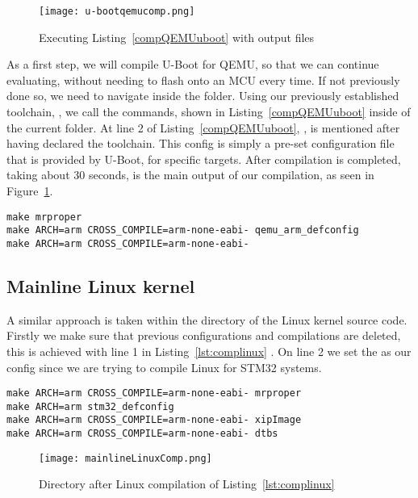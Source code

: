 \begin{figure}[H]
\centering
\texttt{[image: u-bootqemucomp.png]}
\caption{Executing Listing~\ref{compQEMUuboot} with output files}
\label{fig:u-bootqemucomp}
\end{figure}

As a first step, we will compile U-Boot for QEMU, so that we can continue evaluating, without needing to flash onto an MCU every time. If not previously done so, we need to navigate inside the folder. Using our previously established toolchain, , we call the commands, shown in Listing~\ref{compQEMUuboot} inside of the current folder. At line 2 of Listing~\ref{compQEMUuboot}, , is mentioned after having declared the toolchain. This config is simply a pre-set configuration file that is provided by U-Boot, for specific targets. After compilation is completed, taking about 30 seconds,  is the main output of our compilation, as seen in Figure~\ref{fig:u-bootqemucomp}.

\begin{lstlisting}[style=SH, caption=Compiling U-Boot for QEMU, label=compQEMUuboot]
make mrproper
make ARCH=arm CROSS_COMPILE=arm-none-eabi- qemu_arm_defconfig
make ARCH=arm CROSS_COMPILE=arm-none-eabi-
\end{lstlisting}



\subsection{Mainline Linux kernel}
A similar approach is taken within the directory of the Linux kernel source code. Firstly we make sure that previous configurations and compilations are deleted, this is achieved with line 1 in Listing~\ref{lst:complinux} . On line 2 we set the  as our config since we are trying to compile Linux for STM32 systems.

\begin{lstlisting}[style=SH, caption=Compiling the Linux kernel, label=lst:complinux]
make ARCH=arm CROSS_COMPILE=arm-none-eabi- mrproper
make ARCH=arm stm32_defconfig
make ARCH=arm CROSS_COMPILE=arm-none-eabi- xipImage
make ARCH=arm CROSS_COMPILE=arm-none-eabi- dtbs
\end{lstlisting}

\begin{figure}[H]
\centering
\texttt{[image: mainlineLinuxComp.png]}
\caption{Directory after Linux compilation of Listing~\ref{lst:complinux}}
\label{fig:buildroot-menuconfig}
\end{figure}

